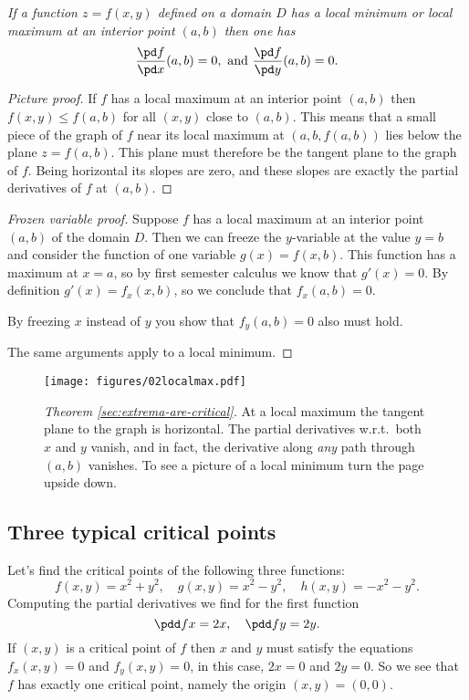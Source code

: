 \label{sec:extrema-are-critical} 
\itshape If a function $z=f(x,y)$ defined on a domain $D$ has a local
minimum or local maximum at an interior point $(a,b)$ then one has
\[
\frac{\pd f}{\pd x}(a,b)=0, \text{ and }   \frac{\pd f}{\pd y}(a,b) = 0.
\]
\upshape
\begin{proof}[Picture proof]
  If $f$ has a local maximum at an interior point $(a,b)$ then $f(x, y)
  \leq f(a, b)$ for all $(x,y)$ close to $(a,b)$.  This means that a small
  piece of the graph of $f$ near its local maximum at $(a,b,f(a,b))$ lies
  below the plane $z=f(a,b)$.  This plane must therefore be the tangent
  plane to the graph of $f$.  Being horizontal its slopes are zero, and
  these slopes are exactly the partial derivatives of $f$ at $(a,b)$.  
\end{proof}
\begin{proof}[Frozen variable proof]
  Suppose $f$ has a local maximum at an interior point $(a,b)$ of the
  domain $D$.  Then we can freeze the $y$-variable at the value $y=b$ and
  consider the function of one variable $g(x) = f(x,b)$.  This function has
  a maximum at $x=a$, so by first semester calculus we know that $g'(x) =
  0$.  By definition $g'(x) = f_x(x, b)$, so we conclude that $f_x(a,b) =
  0$.

  By freezing $x$ instead of $y$ you show that $f_y(a,b)=0$ also must hold.

  The same arguments apply to a local minimum.
\end{proof}
\begin{figure}[htb]
  \centering
  
  \texttt{[image: figures/02localmax.pdf]}
  \caption{\emph{Theorem \ref{sec:extrema-are-critical}. } At a local
    maximum the tangent plane to the graph is horizontal.  The partial
    derivatives w.r.t.\ both $x$ and $y$ vanish, and in fact, the
    derivative along \emph{any} path through $(a,b)$ vanishes.  To see a
    picture of a local minimum turn the page upside down.}
\end{figure}

\subsection{Three typical critical points}  %

\label{sec:criticalpoint-examples} 
Let's find the critical points of the following three functions:
\[
f(x, y) = x^2+y^2,
\quad
g(x, y) = x^2-y^2,
\quad
h(x, y) = -x^2-y^2.
\]
Computing the partial derivatives we find for the first function
\[
\pdd fx = 2x, \quad \pdd fy = 2y.
\]
If $(x,y)$ is a critical point of $f$ then $x$ and $y$ must satisfy the
equations $f_x(x, y) = 0$ and $f_y(x, y) = 0$, in this case, $2x=0$ and
$2y=0$.  So we see that $f$ has exactly one critical point, namely the
origin $(x,y) = (0,0)$.

